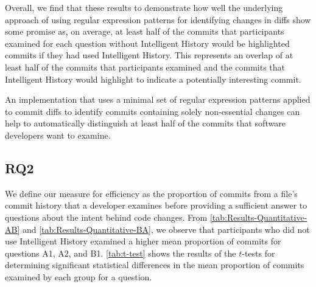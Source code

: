 Overall, we find that these results to demonstrate how well the underlying approach of using regular expression
patterns for identifying  changes in diffs show some promise as, on average,
at least half of the commits that participants examined for each question without Intelligent History
would be highlighted commits if they had used Intelligent History.
This represents an overlap of at least half of the commits that participants examined and the commits
that Intelligent History would highlight to indicate a potentially interesting commit.

\begin{summary}[RQ1]
  An implementation that uses a minimal set of regular expression patterns 
  applied to commit diffs to identify commits containing solely non-essential changes can help to
  automatically distinguish at least half of the commits that software
  developers want to examine.
\end{summary}


\subsection{RQ2}
\label{subsec:RQ2}


We define our measure for efficiency as the proportion of commits from a file's commit history 
that a developer examines before providing a sufficient answer to questions about the intent behind code changes.
From \autoref{tab:Results-Quantitative-AB} and \autoref{tab:Results-Quantitative-BA}, 
we observe that participants who did not use Intelligent History 
examined a higher mean proportion of commits for questions A1, A2, and B1.
\autoref{tab:t-test} shows the results of the $t$-tests for determining significant statistical differences in 
the mean proportion of commits examined by each group for a question.

